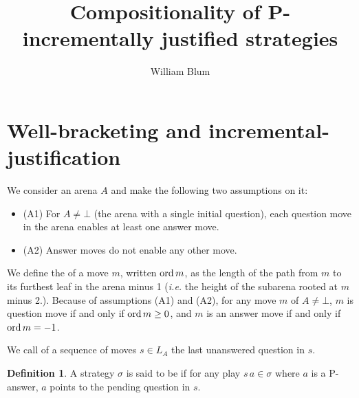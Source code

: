 \newtheorem{lemma}{Lemma}[section]
\newtheorem{proposition}{Proposition}[section]

\theoremstyle{remark}
\newtheorem{remark}{Remark}[section]
\newtheorem{example}{Example}[section]
\newtheorem{property}{Property}[section]

\theoremstyle{definition}
\newtheorem{definition}{Definition}[section]
\newtheorem{algorithm}{Algorithm}[section]


\author{William Blum}
\title{Compositionality of P-incrementally justified strategies}


\maketitle 

\section{Well-bracketing and incremental-justification}

We consider an arena $A$ and make the following two assumptions on it:
\begin{itemize}
\item (A1) For $A \neq \bot$ (the arena with a single initial question), each question move in the arena enables at least one answer move.
\item (A2) Answer moves do not enable any other move.
\end{itemize}

We define the  of a move $m$, written $\mathop{\mathrm{ord}}{m}$, as
the length of the path from $m$ to its furthest leaf in the arena minus 1
({\it i.e.} the height of the subarena rooted at $m$ minus 2.).
Because of assumptions (A1) and (A2),
for any move $m$ of $A \neq \bot$, $m$ is question move if and only if $\mathop{\mathrm{ord}}{m} \geq 0$, and $m$ is an answer move if and only if $\mathop{\mathrm{ord}}{m} = -1$.





We call  of a sequence of moves $s \in L_A$ the last unanswered question in $s$.

\begin{definition}\rm
A strategy $\sigma$ is said to be  if for any play $s \, a \in \sigma$ where $a$ is a  P-answer, $a$ points to the pending question in $s$.
\end{definition}



